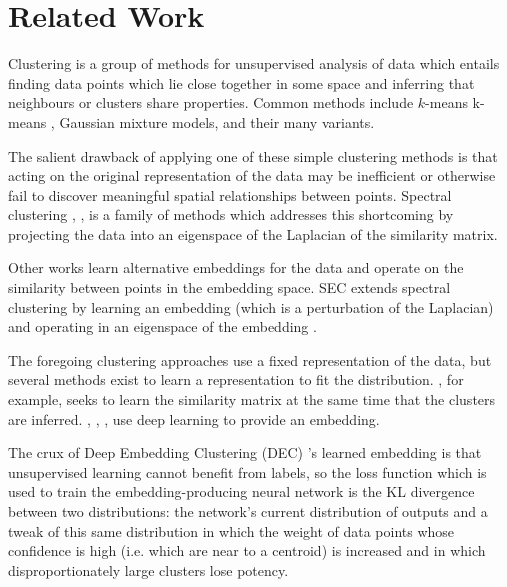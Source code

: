 \section{Related Work}

Clustering is a group of methods for unsupervised analysis of data which entails finding data points which lie close together in some space and inferring that neighbours or clusters share properties. Common methods include $k$-means 
k-means \cite{kmeansmacqueen1967some}, Gaussian mixture models, and their many variants.

The salient drawback of applying one of these simple clustering methods is that acting on the original representation of the data may be inefficient or otherwise fail to discover meaningful spatial relationships between points. Spectral clustering \cite{sc1von2007tutorial}, \cite{sc2bach2004learning}, \cite{sc3ng2002spectral} is a family of methods which addresses this shortcoming by projecting the data into an eigenspace of the Laplacian of the similarity matrix.

Other works learn alternative embeddings for the data and operate on the similarity between points in the embedding space. SEC extends spectral clustering by learning an embedding (which is a perturbation of the Laplacian) and operating in an eigenspace of the embedding \cite{secnie2011spectral}.

The foregoing clustering approaches use a fixed representation of the data, but several methods exist to learn a representation to fit the distribution.  \cite{nie2014clustering}, for example, seeks to learn the similarity matrix at the same time that the clusters are inferred. \cite{zeghidour2016deep}, \cite{xie2016unsupervised}, \cite{chang2017deep}, \cite{dscl_law2017deep} use deep learning to provide an embedding.


The crux of Deep Embedding Clustering (DEC) \cite{xie2016unsupervised}'s learned embedding is that unsupervised learning cannot benefit from labels, so the loss function which is used to train the embedding-producing neural network is the KL divergence between two distributions: the network's current distribution of outputs and a tweak of this same distribution in which the weight of data points whose confidence is high (i.e. which are near to a centroid) is increased and in which disproportionately large clusters lose potency.

